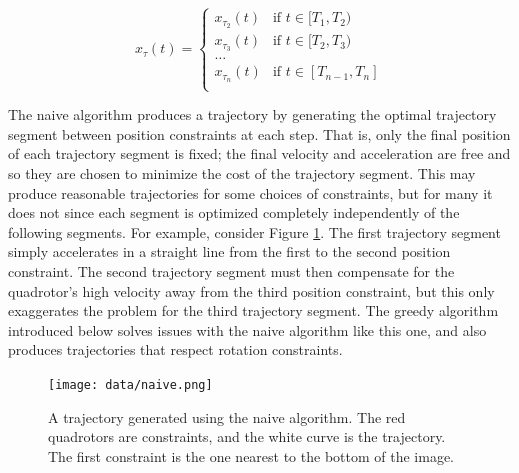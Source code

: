 \documentclass[pageno]{jpaper}
\begin{document}
\begin{equation*}
  x_{\tau}(t) = \begin{cases}
    x_{\tau_2}(t) & \text{if } t \in [T_1, T_2) \\
    x_{\tau_3}(t) & \text{if } t \in [T_2, T_3) \\
    \dots \\
    x_{\tau_n}(t) & \text{if } t \in [T_{n-1}, T_n] \\
  \end{cases}
\end{equation*}

The naive algorithm produces a trajectory by generating the optimal trajectory segment between position constraints at each step. That is, only the final position of each trajectory segment is fixed; the final velocity and acceleration are free and so they are chosen to minimize the cost of the trajectory segment. This may produce reasonable trajectories for some choices of constraints, but for many it does not since each segment is optimized completely independently of the following segments. For example, consider Figure \ref{fig:naive}. The first trajectory segment simply accelerates in a straight line from the first to the second position constraint. The second trajectory segment must then compensate for the quadrotor's high velocity away from the third position constraint, but this only exaggerates the problem for the third trajectory segment. The greedy algorithm introduced below solves issues with the naive algorithm like this one, and also produces trajectories that respect rotation constraints.

\begin{figure}
  \texttt{[image: data/naive.png]}
  \caption{A trajectory generated using the naive algorithm. The red quadrotors are constraints, and the white curve is the trajectory. The first constraint is the one nearest to the bottom of the image.}
  \label{fig:naive}
\end{figure}
\end{document}
